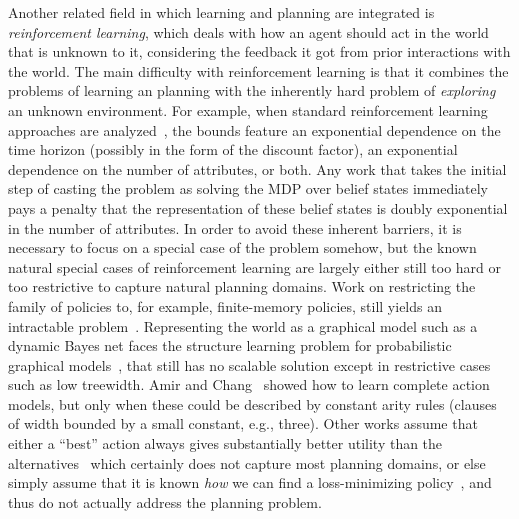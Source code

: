\documentclass[12pt]{article}
\begin{document}
Another related field in which learning and planning are integrated is {\em reinforcement learning}, which deals with how an agent
should act in the world that is unknown to it, considering the feedback it got from prior interactions with the world. The main difficulty with reinforcement learning is that it combines the problems of learning an planning with the inherently hard problem of {\em exploring} an unknown environment. For example, when standard reinforcement learning approaches are analyzed~\cite{kearns2002POMDPsample,shani2005modelPOMDP}, the bounds feature an exponential dependence on the time horizon (possibly in the form of the discount factor), an exponential dependence on the number of attributes, or both. Any work that takes the initial step of casting the problem as solving the MDP over belief states immediately pays a penalty that the representation of these belief states is doubly exponential in the number of attributes.  In order to avoid these inherent barriers, it is necessary to focus on a special case of the problem somehow, but the known natural special cases of reinforcement learning are largely either still too hard or too restrictive to capture natural planning domains. Work on restricting the family of policies to, for example, finite-memory policies, still yields an intractable problem~\cite{meuleau1999finitestate}. Representing the world as a graphical model such as a dynamic Bayes net faces the structure learning problem for probabilistic graphical models~\cite[Section~19.4]{koller2009pgm}, that still has no scalable solution except in restrictive cases such as low treewidth. 
  Amir and Chang~\cite{amir2008} showed how to learn complete action models, but only when these could be described by constant arity rules (clauses of width bounded by a small constant, e.g., three).
  Other works assume that either a ``best'' action always gives substantially better utility than the alternatives~\cite{fern2006policyIteration} which certainly does not capture most planning domains, or else simply assume that it is known {\em how} we can find a loss-minimizing policy~\cite{lazaric2010policyIteration}, and thus do not actually address the planning problem.


\end{document}
